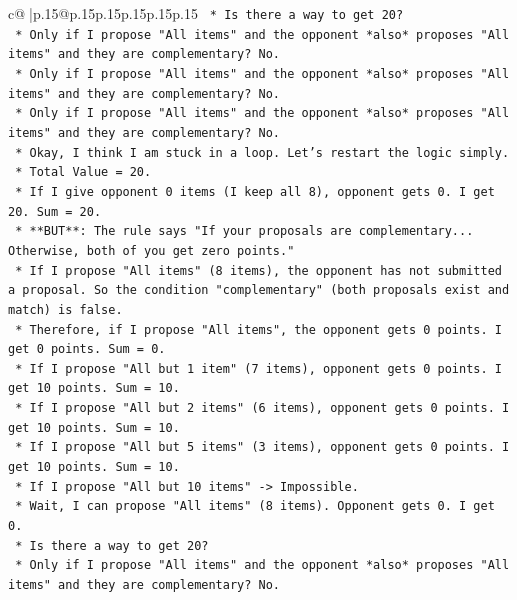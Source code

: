 \documentclass{article}
\begin{document}
{\begin{supertabular}{c@{$\;$}|p{.15\linewidth}@{}p{.15\linewidth}p{.15\linewidth}p{.15\linewidth}p{.15\linewidth}p{.15\linewidth}}
{{{\texttt{                *   Is there a way to get 20?} \\
\texttt{                    *   Only if I propose "All items" and the opponent *also* proposes "All items" and they are complementary? No.} \\
\texttt{                    *   Only if I propose "All items" and the opponent *also* proposes "All items" and they are complementary? No.} \\
\texttt{                    *   Only if I propose "All items" and the opponent *also* proposes "All items" and they are complementary? No.} \\
\texttt{                *   Okay, I think I am stuck in a loop. Let's restart the logic simply.} \\
\texttt{                *   Total Value = 20.} \\
\texttt{                *   If I give opponent 0 items (I keep all 8), opponent gets 0. I get 20. Sum = 20.} \\
\texttt{                *   **BUT**: The rule says "If your proposals are complementary... Otherwise, both of you get zero points."} \\
\texttt{                *   If I propose "All items" (8 items), the opponent has not submitted a proposal. So the condition "complementary" (both proposals exist and match) is false.} \\
\texttt{                *   Therefore, if I propose "All items", the opponent gets 0 points. I get 0 points. Sum = 0.} \\
\texttt{                *   If I propose "All but 1 item" (7 items), opponent gets 0 points. I get 10 points. Sum = 10.} \\
\texttt{                *   If I propose "All but 2 items" (6 items), opponent gets 0 points. I get 10 points. Sum = 10.} \\
\texttt{                *   If I propose "All but 5 items" (3 items), opponent gets 0 points. I get 10 points. Sum = 10.} \\
\texttt{                *   If I propose "All but 10 items" {-}> Impossible.} \\
\texttt{                *   Wait, I can propose "All items" (8 items). Opponent gets 0. I get 0.} \\
\texttt{                *   Is there a way to get 20?} \\
\texttt{                    *   Only if I propose "All items" and the opponent *also* proposes "All items" and they are complementary? No.} \\
}}}
\end{supertabular}}
\end{document}
